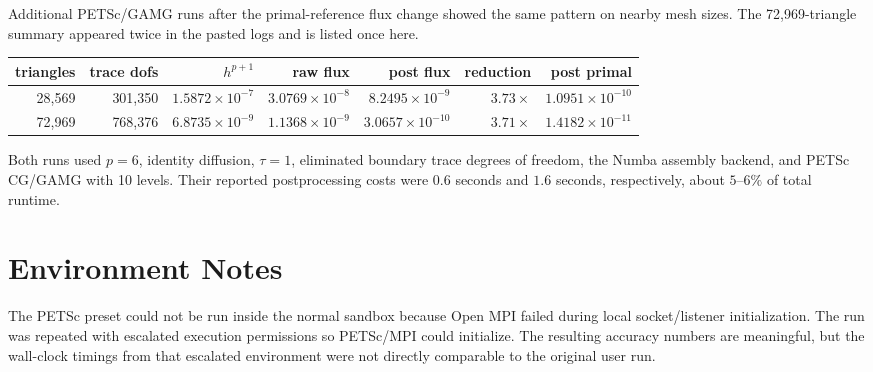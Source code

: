 \documentclass[11pt]{article}
\begin{document}
Additional PETSc/GAMG runs after the primal-reference flux change showed the
same pattern on nearby mesh sizes. The 72,969-triangle summary appeared twice
in the pasted logs and is listed once here.
\begin{center}
\small
\setlength{\tabcolsep}{4pt}
\begin{tabular}{rrrrrrr}
\toprule
triangles & trace dofs & $h^{p+1}$ & raw flux & post flux & reduction & post primal \\
\midrule
28,569 & 301,350 & $1.5872{\times}10^{-7}$ & $3.0769{\times}10^{-8}$ &
$8.2495{\times}10^{-9}$ & $3.73{\times}$ & $1.0951{\times}10^{-10}$ \\
72,969 & 768,376 & $6.8735{\times}10^{-9}$ & $1.1368{\times}10^{-9}$ &
$3.0657{\times}10^{-10}$ & $3.71{\times}$ & $1.4182{\times}10^{-11}$ \\
\bottomrule
\end{tabular}
\end{center}
Both runs used $p=6$, identity diffusion, $\tau=1$, eliminated boundary
trace degrees of freedom, the Numba assembly backend, and PETSc CG/GAMG with
10 levels. Their reported postprocessing costs were $0.6$ seconds and
$1.6$ seconds, respectively, about $5$--$6\%$ of total runtime.

\section{Environment Notes}

The PETSc preset could not be run inside the normal sandbox because Open MPI
failed during local socket/listener initialization. The run was repeated with
escalated execution permissions so PETSc/MPI could initialize. The resulting
accuracy numbers are meaningful, but the wall-clock timings from that
escalated environment were not directly comparable to the original user run.
\end{document}
